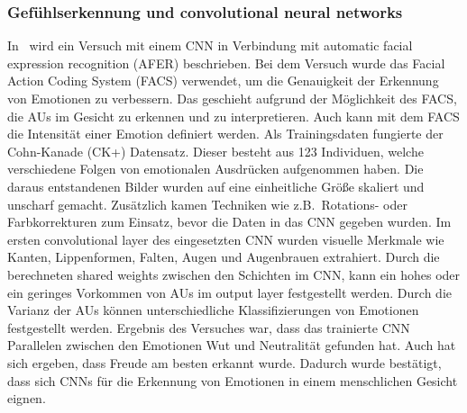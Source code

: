 \subsubsection*{Gefühlserkennung und convolutional neural networks}
In~\cite{facialemotionrecusingcnn} wird ein Versuch mit einem CNN in Verbindung mit automatic facial expression recognition (AFER) beschrieben. Bei dem Versuch wurde das Facial Action Coding System (FACS) verwendet, um die Genauigkeit der Erkennung von Emotionen zu verbessern. Das geschieht aufgrund der Möglichkeit des FACS, die AUs im Gesicht zu erkennen und zu interpretieren. Auch kann mit dem FACS die Intensität einer Emotion definiert werden. Als Trainingsdaten fungierte der Cohn-Kanade (CK+) Datensatz. Dieser besteht aus 123 Individuen, welche verschiedene Folgen von emotionalen Ausdrücken aufgenommen haben. Die daraus entstandenen Bilder wurden auf eine einheitliche Größe skaliert und unscharf gemacht. Zusätzlich kamen Techniken wie z.B.~Rotations- oder Farbkorrekturen zum Einsatz, bevor die Daten in das CNN gegeben wurden. Im ersten convolutional layer des eingesetzten CNN wurden visuelle Merkmale wie Kanten, Lippenformen, Falten, Augen und Augenbrauen extrahiert. Durch die berechneten shared weights zwischen den Schichten im CNN, kann ein hohes oder ein geringes Vorkommen von AUs im output layer festgestellt werden. Durch die Varianz der AUs können unterschiedliche Klassifizierungen von Emotionen festgestellt werden. Ergebnis des Versuches war, dass das trainierte CNN Parallelen zwischen den Emotionen Wut und Neutralität gefunden hat. Auch hat sich ergeben, dass Freude am besten erkannt wurde. Dadurch wurde bestätigt, dass sich CNNs für die Erkennung von Emotionen in einem menschlichen Gesicht eignen.
\\
\\
